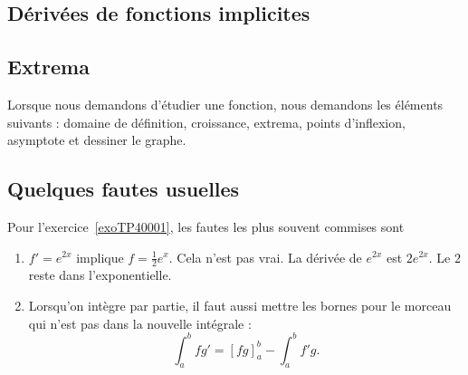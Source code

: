 \subsection{Dérivées de fonctions implicites}

\subsection{Extrema}


Lorsque nous demandons d'étudier une fonction, nous demandons les éléments suivants : domaine de définition, croissance, extrema, points d'inflexion, asymptote et dessiner le graphe.



\subsection{Quelques fautes usuelles}

Pour l'exercice~\ref{exoTP40001}, les fautes les plus souvent commises sont
\begin{enumerate}

	\item
		$f'= e^{2x}$ implique $f=\frac{1}{ 2 } e^{x}$. Cela n'est pas vrai. La dérivée de $ e^{2x}$ est $2 e^{2x}$. Le $2$ reste dans l'exponentielle.

	\item
		Lorsqu'on intègre par partie, il faut aussi mettre les bornes pour le morceau qui n'est pas dans la nouvelle intégrale :
		\begin{equation}
			\int_a^b fg'=[fg]_a^b-\int_a^bf'g.
		\end{equation}
\end{enumerate}

